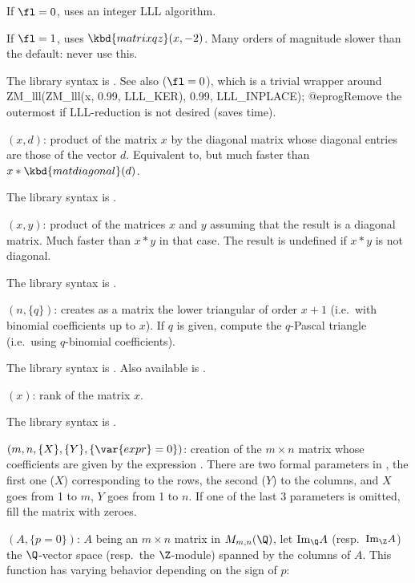 If $\fl=0$, uses an integer LLL algorithm.

If $\fl=1$, uses $\kbd{matrixqz}(x,-2)$. Many orders of magnitude slower
than the default: never use this.

The library syntax is .
See also  ($\fl=0$), which is a trivial
wrapper around
\bprog
ZM_lll(ZM_lll(x, 0.99, LLL_KER), 0.99, LLL_INPLACE);
@eprog\noindent Remove the outermost  if LLL-reduction is not
desired (saves time).

$(x,d)$: \label{se:matmuldiagonal}product of the matrix $x$ by the diagonal
matrix whose diagonal entries are those of the vector $d$. Equivalent to,
but much faster than $x*\kbd{matdiagonal}(d)$.

The library syntax is .

$(x,y)$: \label{se:matmultodiagonal}product of the matrices $x$ and $y$ assuming that the result is a
diagonal matrix. Much faster than $x*y$ in that case. The result is
undefined if $x*y$ is not diagonal.

The library syntax is .

$(n,\{q\})$: \label{se:matpascal}creates as a matrix the lower triangular
 of order $x+1$ (i.e.~with binomial coefficients
up to $x$). If $q$ is given, compute the $q$-Pascal triangle (i.e.~using
$q$-binomial coefficients).

The library syntax is .
Also available is .

$(x)$: \label{se:matrank}rank of the matrix $x$.

The library syntax is .

$(m,n,\{X\},\{Y\},\{\var{expr}=0\})$: \label{se:matrix}creation of the
$m\times n$ matrix whose coefficients are given by the expression
. There are two formal parameters in , the first one
($X$) corresponding to the rows, the second ($Y$) to the columns, and $X$
goes from 1 to $m$, $Y$ goes from 1 to $n$. If one of the last 3 parameters
is omitted, fill the matrix with zeroes.

$(A,\{p=0\})$: \label{se:matrixqz}$A$ being an $m\times n$ matrix in $M_{m,n}(\Q)$, let
$\text{Im}_\Q A$ (resp.~$\text{Im}_\Z A$) the $\Q$-vector space
(resp.~the $\Z$-module) spanned by the columns of $A$. This function has
varying behavior depending on the sign of $p$:


